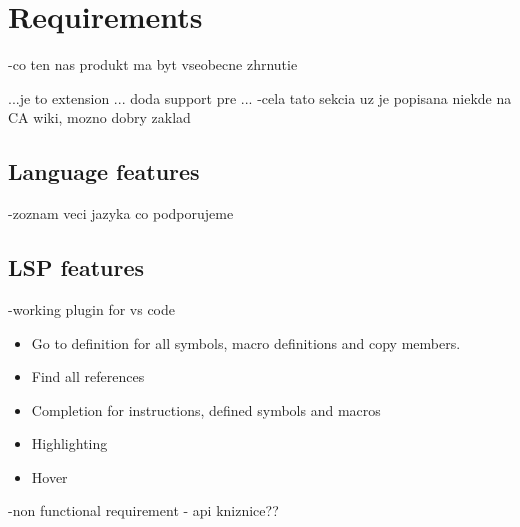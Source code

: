 \chapter{Requirements}


-co ten nas produkt ma byt
vseobecne zhrnutie

...je to extension ... doda support pre ... 
-cela tato sekcia uz je popisana niekde na CA wiki, mozno dobry zaklad

\section{Language features}
-zoznam veci jazyka co podporujeme




\section{LSP features}
-working plugin for vs code

\begin{itemize}
	\item Go to definition for all symbols, macro definitions and copy members.
	\item Find all references
	\item Completion for instructions, defined symbols and macros
	\item Highlighting
	\item Hover
\end{itemize}



-non functional requirement - api kniznice??
